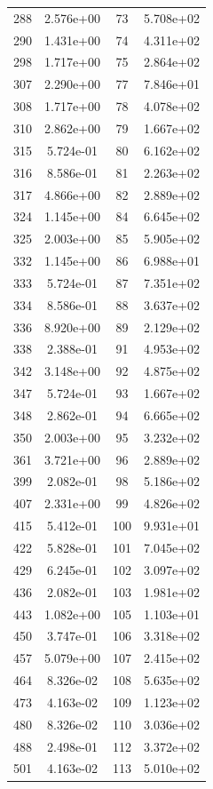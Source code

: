 \documentclass[12pt]{article}
\begin{document}
\begin{longtable}{@{}cccc@{}}
288 & 2.576e+00 & 73 & 5.708e+02 \\
290 & 1.431e+00 & 74 & 4.311e+02 \\
298 & 1.717e+00 & 75 & 2.864e+02 \\
307 & 2.290e+00 & 77 & 7.846e+01 \\
308 & 1.717e+00 & 78 & 4.078e+02 \\
310 & 2.862e+00 & 79 & 1.667e+02 \\
315 & 5.724e-01 & 80 & 6.162e+02 \\
316 & 8.586e-01 & 81 & 2.263e+02 \\
317 & 4.866e+00 & 82 & 2.889e+02 \\
324 & 1.145e+00 & 84 & 6.645e+02 \\
325 & 2.003e+00 & 85 & 5.905e+02 \\
332 & 1.145e+00 & 86 & 6.988e+01 \\
333 & 5.724e-01 & 87 & 7.351e+02 \\
334 & 8.586e-01 & 88 & 3.637e+02 \\
336 & 8.920e+00 & 89 & 2.129e+02 \\
338 & 2.388e-01 & 91 & 4.953e+02 \\
342 & 3.148e+00 & 92 & 4.875e+02 \\
347 & 5.724e-01 & 93 & 1.667e+02 \\
348 & 2.862e-01 & 94 & 6.665e+02 \\
350 & 2.003e+00 & 95 & 3.232e+02 \\
361 & 3.721e+00 & 96 & 2.889e+02 \\
399 & 2.082e-01 & 98 & 5.186e+02 \\
407 & 2.331e+00 & 99 & 4.826e+02 \\
415 & 5.412e-01 & 100 & 9.931e+01 \\
422 & 5.828e-01 & 101 & 7.045e+02 \\
429 & 6.245e-01 & 102 & 3.097e+02 \\
436 & 2.082e-01 & 103 & 1.981e+02 \\
443 & 1.082e+00 & 105 & 1.103e+01 \\
450 & 3.747e-01 & 106 & 3.318e+02 \\
457 & 5.079e+00 & 107 & 2.415e+02 \\
464 & 8.326e-02 & 108 & 5.635e+02 \\
473 & 4.163e-02 & 109 & 1.123e+02 \\
480 & 8.326e-02 & 110 & 3.036e+02 \\
488 & 2.498e-01 & 112 & 3.372e+02 \\
501 & 4.163e-02 & 113 & 5.010e+02 \\

\end{longtable}
\end{document}
